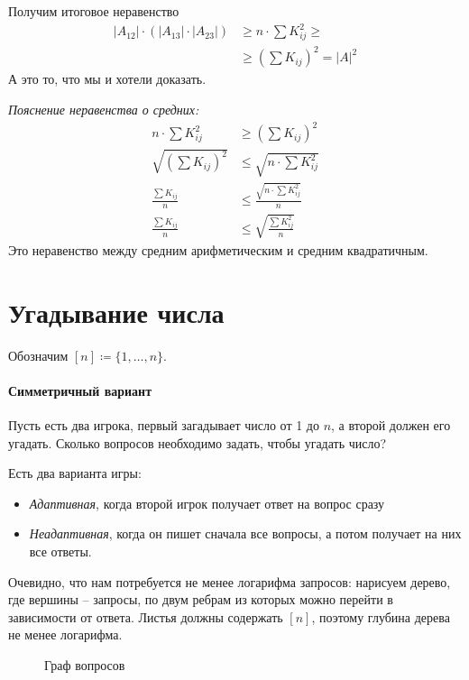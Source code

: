 \begin{proof*}
    Получим итоговое неравенство
	\begin{align*}
		\lvert A_{12} \rvert  \cdot \left( \lvert A_{13} \rvert \cdot \lvert A_{23} \rvert   \right) &\ge  n \cdot \sum K_{ij}^2 \ge \tag{неравенство о средних} \\
        & \ge \left( \sum K_{ij} \right)^2 = \lvert A \rvert ^2 
	\end{align*}
	А это то, что мы и хотели доказать.
	
	\noindent
	\textit{Пояснение неравенства о средних:}
	\begin{align*}
	    n \cdot \sum K_{ij}^2 &\ge \left( \sum K_{ij} \right)^2\\
	    \sqrt{\left( \sum K_{ij} \right)^2} &\le \sqrt{n \cdot \sum K_{ij}^2}\\
	    \frac{\sum K_{ij}}{n} &\le \frac{\sqrt{n \cdot \sum K_{ij}^2}}{n}\\
	    \frac{ \sum K_{ij}}{n} &\le \sqrt{\frac{\sum K_{ij}^2}{n}}
	\end{align*}
	Это неравенство между средним арифметическим и средним квадратичным.
\end{proof*}

\section{Угадывание числа}
Обозначим $ [n] \coloneqq \{1, \ldots , n\}$.
\paragraph{Симметричный вариант}
Пусть есть два игрока, первый загадывает число от 1 до $ n$, а второй должен его угадать. Сколько вопросов необходимо задать, чтобы угадать число?

Есть два варианта игры:
\begin{itemize}
	\item \textit{Адаптивная}, когда второй игрок получает ответ на вопрос сразу
	\item \textit{Неадаптивная}, когда он пишет сначала все вопросы, а потом получает на них все ответы.
\end{itemize}
Очевидно, что нам потребуется не менее логарифма запросов: нарисуем дерево, где вершины -- запросы, по двум ребрам из которых  можно перейти в зависимости от ответа. Листья должны содержать $ [n]$, поэтому глубина дерева не менее логарифма.
\begin{figure}[ht]
    \centering
    \label{fig:graph-img}
	\caption{Граф вопросов}
\end{figure}

